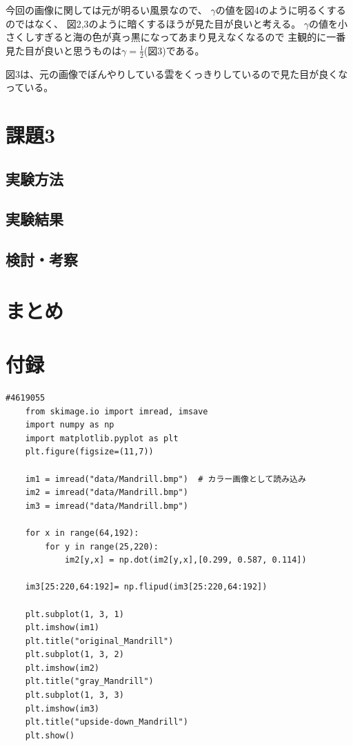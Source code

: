 \documentclass[12pt]{jarticle}
\begin{document}
今回の画像に関しては元が明るい風景なので、
$\gamma$の値を図4のように明るくするのではなく、
図2,3のように暗くするほうが見た目が良いと考える。
$\gamma$の値を小さくしすぎると海の色が真っ黒になってあまり見えなくなるので
主観的に一番見た目が良いと思うものは$\gamma=\frac{1}{2}$(図3)である。

図3は、元の画像でぼんやりしている雲をくっきりしているので見た目が良くなっている。

\section{課題3}
\subsection{実験方法}
\subsection{実験結果}
\subsection{検討・考察}


\clearpage

\section{まとめ}



\begin{thebibliography}{99}

\end{thebibliography}

\clearpage
\appendix
\section{付録}

\begin{lstlisting}[style = py,caption=kadai1]
    #4619055
    from skimage.io import imread, imsave
    import numpy as np
    import matplotlib.pyplot as plt
    plt.figure(figsize=(11,7))
    
    im1 = imread("data/Mandrill.bmp")  # カラー画像として読み込み
    im2 = imread("data/Mandrill.bmp")
    im3 = imread("data/Mandrill.bmp")
    
    for x in range(64,192):
        for y in range(25,220):
            im2[y,x] = np.dot(im2[y,x],[0.299, 0.587, 0.114])
    
    im3[25:220,64:192]= np.flipud(im3[25:220,64:192])
    
    plt.subplot(1, 3, 1)
    plt.imshow(im1)
    plt.title("original_Mandrill") 
    plt.subplot(1, 3, 2)
    plt.imshow(im2)
    plt.title("gray_Mandrill") 
    plt.subplot(1, 3, 3)
    plt.imshow(im3)
    plt.title("upside-down_Mandrill")
    plt.show()
\end{lstlisting}
\end{document}

